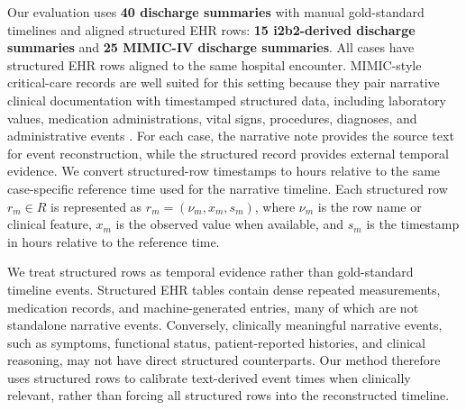 Our evaluation uses \textbf{40 discharge summaries} with manual gold-standard timelines and aligned structured EHR rows: \textbf{15 i2b2-derived discharge summaries} and \textbf{25 MIMIC-IV discharge summaries}.
All cases have structured EHR rows aligned to the same hospital encounter.
MIMIC-style critical-care records are well suited for this setting because they pair narrative clinical documentation with timestamped structured data, including laboratory values, medication administrations, vital signs, procedures, diagnoses, and administrative events \cite{ch08:johnson2016mimic,ch08:johnson2023mimic}.
For each case, the narrative note provides the source text for event reconstruction, while the structured record provides external temporal evidence.
We convert structured-row timestamps to hours relative to the same case-specific reference time used for the narrative timeline.
Each structured row $r_m \in R$ is represented as $r_m=(\nu_m,x_m,s_m)$, where $\nu_m$ is the row name or clinical feature, $x_m$ is the observed value when available, and $s_m$ is the timestamp in hours relative to the reference time.


We treat structured rows as temporal evidence rather than gold-standard timeline events.
Structured EHR tables contain dense repeated measurements, medication records, and machine-generated entries, many of which are not standalone narrative events.
Conversely, clinically meaningful narrative events, such as symptoms, functional status, patient-reported histories, and clinical reasoning, may not have direct structured counterparts.
Our method therefore uses structured rows to calibrate text-derived event times when clinically relevant, rather than forcing all structured rows into the reconstructed timeline.


